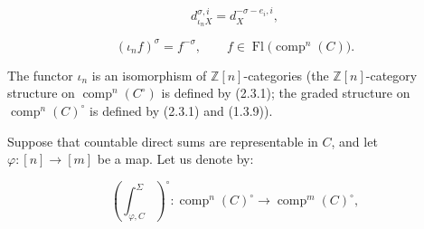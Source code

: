 \begin{equation}
  d_{\iota_nX}^{\sigma,i}=d_X^{-\sigma-e_i,i},
  \tag{2.4.1.2}
\end{equation}

\begin{equation*}
  (\iota_nf)^\sigma=f^{-\sigma},
  \qquad f\in\operatorname{Fl}\bigl(\operatorname{comp}^{n}(C)\bigr).
\end{equation*}

The functor $\iota_n$ is an isomorphism of $\mathbb Z[n]$-categories
(the $\mathbb Z[n]$-category structure on
$\operatorname{comp}^{n}(C^\circ)$ is defined by (2.3.1); the graded
structure on $\operatorname{comp}^{n}(C)^\circ$ is defined by (2.3.1) and
(1.3.9)).

Suppose that countable direct sums are representable in $C$, and let
$\varphi\colon[n]\longrightarrow[m]$ be a map. Let us denote by:

\begin{equation}
  \left(\int_{\varphi,C}^{\Sigma}\right)^\circ\colon
  \operatorname{comp}^{n}(C)^\circ
  \longrightarrow
  \operatorname{comp}^{m}(C)^\circ,
  \tag{2.4.1.3}
\end{equation}
